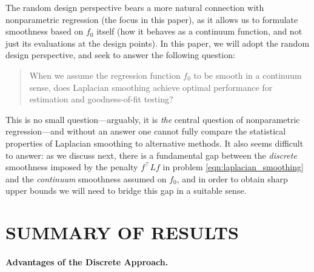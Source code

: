 \documentclass[twoside]{article}
\newcommand{\1}{\mathbf{1}}
\newcommand{\Lap}{L}
\theoremstyle{definition}
\theoremstyle{remark}
\begin{document}
The random design perspective bears a more natural connection with nonparametric regression (the focus in this paper), as it allows us to formulate smoothness based on $f_0$ itself (how it behaves as a continuum function, and not just its evaluations at the design points). In this paper, we will adopt the random design perspective, and seek to answer the following question:
\begin{quote}{When we assume the regression function $f_0$ to be smooth in a continuum sense, does Laplacian smoothing achieve optimal performance for estimation and goodness-of-fit testing?} 
\end{quote}
This is no small question---arguably, it is \emph{the} central question of nonparametric regression---and without an answer one cannot fully compare the statistical properties of Laplacian smoothing to alternative methods. It also seems difficult to answer: as we discuss next, there is a fundamental gap between the \emph{discrete} smoothness imposed by the penalty $f^\top \Lap f$ in problem \eqref{eqn:laplacian_smoothing} and the \emph{continuum} smoothness assumed on $f_0$, and in order to obtain sharp upper bounds we will need to bridge this gap in a suitable sense.

\section{SUMMARY OF RESULTS}

\paragraph{Advantages of the Discrete Approach.} 
\end{document}
